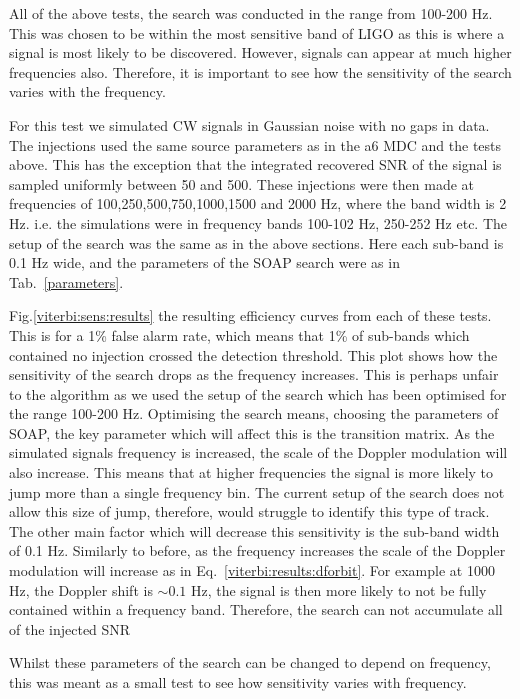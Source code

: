 All of the above tests, the search was conducted in the range from 100-200 Hz.
This was chosen to be within the most sensitive band of \ac{LIGO} as this is where a signal is most likely to be discovered.
However, signals can appear at much higher frequencies also.
Therefore, it is important to see how the sensitivity of the search varies with the frequency.
 
For this test we simulated \ac{CW} signals in Gaussian noise with no gaps in data. 
The injections used the same source parameters as in the a6 \ac{MDC} \citep{walsh2016ComparisonMethods} and the tests above. 
This has the exception that the integrated recovered \ac{SNR} of the signal is sampled uniformly between 50 and 500. 
These injections were then made at frequencies of 100,250,500,750,1000,1500 and 2000 Hz, where the band width is 2 Hz. i.e. the simulations were in frequency bands 100-102 Hz, 250-252 Hz etc.
The setup of the search was the same as in the above sections. 
Here each sub-band is 0.1 Hz wide, and the parameters of the SOAP search were as in Tab.~\ref{parameters}.

Fig.\ref{viterbi:sens:results} the resulting efficiency curves from each of these tests.
This is for a 1\% false alarm rate, which means that 1\% of sub-bands which contained no injection crossed the detection threshold. 
This plot shows how the sensitivity of the search drops as the frequency increases.
This is perhaps unfair to the algorithm as we used the setup of the search which has been optimised for the range 100-200 Hz.
Optimising the search means, choosing the parameters of SOAP, the key parameter which will affect this is the transition matrix. 
As the simulated signals frequency is increased, the scale of the Doppler modulation will also increase.
This means that at higher frequencies the signal is more likely to jump more than a single frequency bin. 
The current setup of the search does not allow this size of jump, therefore, would struggle to identify this type of track.
The other main factor which will decrease this sensitivity is the sub-band width of 0.1 Hz. 
Similarly to before, as the frequency increases the scale of the Doppler modulation will increase as in Eq.~\ref{viterbi:results:dforbit}.
For example at 1000 Hz, the Doppler shift is $\sim 0.1$ Hz, the signal is then more likely to not be fully contained within a frequency band. 
Therefore, the search can not accumulate all of the injected \ac{SNR}

Whilst these parameters of the search can be changed to depend on frequency, this was meant as a small test to see how sensitivity varies with frequency.


